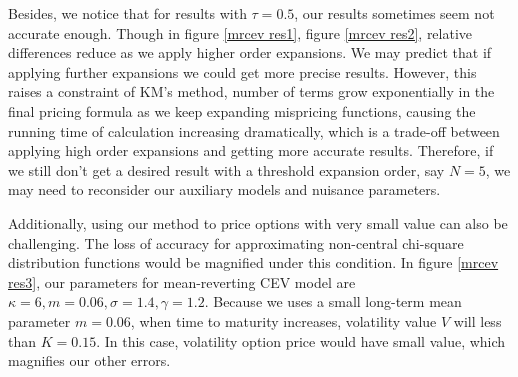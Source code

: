 Besides, we notice that for results with $\tau=0.5$, our results sometimes seem not accurate enough. Though in figure \ref{mrcev res1}, figure \ref{mrcev res2}, relative differences reduce as we apply higher order expansions. We may predict that if applying further expansions we could get more precise results. However, this raises a constraint of KM's method, number of terms grow exponentially in the final pricing formula as we keep expanding mispricing functions, causing the running time of calculation increasing dramatically, which is a trade-off between applying high order expansions and getting more accurate results. Therefore, if we still don't get a desired result with a threshold expansion order, say $N=5$, we may need to reconsider our auxiliary models and nuisance parameters.

Additionally, using our method to price options with very small value can also be challenging. The loss of accuracy for approximating non-central chi-square distribution functions would be magnified under this condition. In figure \ref{mrcev res3}, our parameters for mean-reverting CEV model are $\kappa=6, m=0.06, \sigma=1.4, \gamma=1.2$. Because we uses a small long-term mean parameter $m=0.06$, when time to maturity increases, volatility value $V$ will less than $K=0.15$. In this case, volatility option price would have small value, which magnifies our other errors.

